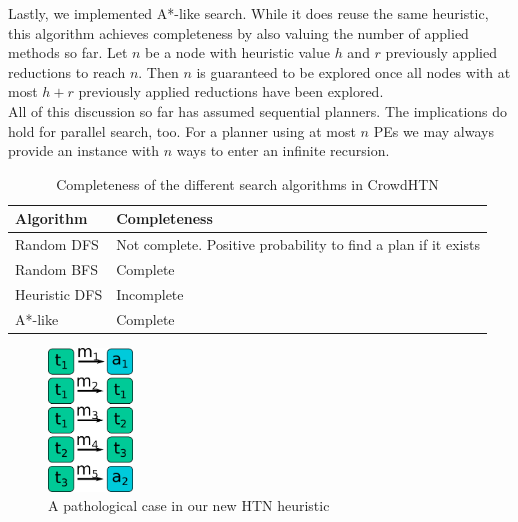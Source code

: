 Lastly, we implemented A*-like search. While it does reuse the same heuristic, this algorithm achieves completeness by also valuing the number of applied methods so far. Let $n$ be a node with heuristic value $h$ and $r$ previously applied reductions to reach $n$. Then $n$ is guaranteed to be explored once all nodes with at most $h + r$ previously applied reductions have been explored. \\
All of this discussion so far has assumed sequential planners. The implications do hold for parallel search, too. For a planner using at most $n$ PEs we may always provide an instance with $n$ ways to enter an infinite recursion.
\begin{table}
	\caption{Completeness of the different search algorithms in CrowdHTN}
	\label{table: search completeness}
	\centering
	\begin{tabular}{| l | l |}
		\hline
		Algorithm & Completeness \\
		\hline
		Random DFS & Not complete. Positive probability to find a plan if it exists \\
		Random BFS & Complete \\
		Heuristic DFS & Incomplete \\
		A*-like & Complete \\
		\hline
	\end{tabular}
\end{table}
\begin{figure}
	\caption{A pathological case in our new HTN heuristic}
	\label{figure: improv heuristic pathological}
	\centering
	\includegraphics[width=0.2\textwidth]{images/final/heuristic_pathological}
\end{figure}

